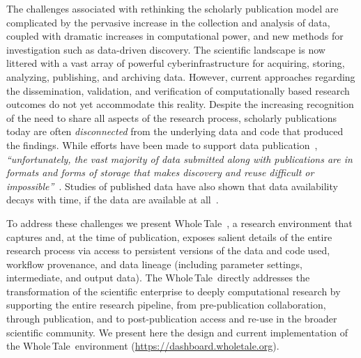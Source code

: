 \documentclass{elsarticle}
\newcommand{\wt}{Whole\,Tale}
\begin{document}
The challenges associated with rethinking the scholarly publication model are complicated by
the pervasive increase in the collection and analysis of data, coupled with dramatic increases 
in computational power, and new methods for investigation such as data-driven discovery. 
The scientific landscape is now littered with a vast array of powerful
cyberinfrastructure for acquiring, storing, analyzing, publishing, and archiving data. However, current approaches regarding the dissemination, validation, and verification of computationally based 
research outcomes do not yet accommodate this reality. 
Despite the increasing recognition of the need to share all aspects of the research process, 
scholarly publications today are often \emph{disconnected} from the underlying data and code 
that produced the findings. While efforts have been made to support data publication~\cite{dataverse,figshare,chard15publication}, 
\emph{``unfortunately, the vast majority of data submitted along with 
publications are in formats and forms of storage that makes discovery and reuse difficult or 
impossible''}~\cite{copdess}. Studies of published data have also shown
that data availability decays with time, if the data are available at all~\cite{views14decline}.

To address these challenges we present \wt~\cite{ludascher16wt}, a research environment that captures and, at the time of publication, exposes salient details of the entire research process via access to persistent versions of the data and code used, workflow provenance, and data lineage (including parameter settings, intermediate, and output data). The \wt\ directly addresses the transformation of the scientific enterprise to deeply computational research by supporting the entire 
research pipeline, from pre-publication collaboration, through publication, and to post-publication 
access and re-use in the broader scientific community.
We present here the design and current implementation of the \wt\ environment (\url{https://dashboard.wholetale.org}).

\end{document}
